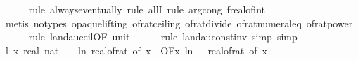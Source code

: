 \begin{isabellebody}
\ \ \ \ \isamarkupfalse%
\ {\isacharparenleft}{\kern0pt}rule\ always{\isacharunderscore}{\kern0pt}eventually{\isacharcomma}{\kern0pt}\ rule\ allI{\isacharcomma}{\kern0pt}\ rule\ arg{\isacharunderscore}{\kern0pt}cong{\isacharbrackleft}{\kern0pt}\ f{\isacharequal}{\kern0pt}{\isachardoublequoteopen}real{\isacharunderscore}{\kern0pt}of{\isacharunderscore}{\kern0pt}int{\isachardoublequoteclose}{\isacharbrackright}{\kern0pt}{\isacharparenright}{\kern0pt}\ \isanewline
\ \ \ \ \ \isamarkupfalse%
\ {\isacharparenleft}{\kern0pt}metis\ {\isacharparenleft}{\kern0pt}no{\isacharunderscore}{\kern0pt}types{\isacharcomma}{\kern0pt}\ opaque{\isacharunderscore}{\kern0pt}lifting{\isacharparenright}{\kern0pt}\ of{\isacharunderscore}{\kern0pt}rat{\isacharunderscore}{\kern0pt}ceiling\ of{\isacharunderscore}{\kern0pt}rat{\isacharunderscore}{\kern0pt}divide\ of{\isacharunderscore}{\kern0pt}rat{\isacharunderscore}{\kern0pt}numeral{\isacharunderscore}{\kern0pt}eq\ of{\isacharunderscore}{\kern0pt}rat{\isacharunderscore}{\kern0pt}power{\isacharparenright}{\kern0pt}\isanewline
\ \ \ \ \isamarkupfalse%
\ {\isacharparenleft}{\kern0pt}rule\ landau{\isacharunderscore}{\kern0pt}ceil{\isacharbrackleft}{\kern0pt}OF\ unit{\isacharunderscore}{\kern0pt}{}{\isacharbrackright}{\kern0pt}{\isacharparenright}{\kern0pt}\isanewline
\ \ \ \ \isamarkupfalse%
\ {\isacharparenleft}{\kern0pt}rule\ landau{\isacharunderscore}{\kern0pt}const{\isacharunderscore}{\kern0pt}inv{\isacharcomma}{\kern0pt}\ simp{\isacharcomma}{\kern0pt}\ simp{\isacharparenright}{\kern0pt}\isanewline
\isanewline
\ \ \isamarkupfalse%
\ l{}{\isacharcolon}{\kern0pt}\ {\isachardoublequoteopen}{\isacharparenleft}{\kern0pt}{\isasymlambda}x{\isachardot}{\kern0pt}\ real\ {\isacharparenleft}{\kern0pt}nat\ {\isasymlceil}{\isacharminus}{\kern0pt}\ {\isacharparenleft}{\kern0pt}{}{}\ {\isacharasterisk}{\kern0pt}\ ln\ {\isacharparenleft}{\kern0pt}real{\isacharunderscore}{\kern0pt}of{\isacharunderscore}{\kern0pt}rat\ {\isacharparenleft}{\kern0pt}{\isasymepsilon}{\isacharunderscore}{\kern0pt}of\ x{\isacharparenright}{\kern0pt}{\isacharparenright}{\kern0pt}{\isacharparenright}{\kern0pt}{\isasymrceil}{\isacharparenright}{\kern0pt}{\isacharparenright}{\kern0pt}\ {\isasymin}\ O{\isacharbrackleft}{\kern0pt}{\isacharquery}{\kern0pt}F{\isacharbrackright}{\kern0pt}{\isacharparenleft}{\kern0pt}{\isasymlambda}x{\isachardot}{\kern0pt}\ ln\ {\isacharparenleft}{\kern0pt}{}\ {\isacharslash}{\kern0pt}\ real{\isacharunderscore}{\kern0pt}of{\isacharunderscore}{\kern0pt}rat\ {\isacharparenleft}{\kern0pt}{\isasymepsilon}{\isacharunderscore}{\kern0pt}of\ x{\isacharparenright}{\kern0pt}{\isacharparenright}{\kern0pt}{\isacharparenright}{\kern0pt}{\isachardoublequoteclose}\isanewline

\end{isabellebody}
